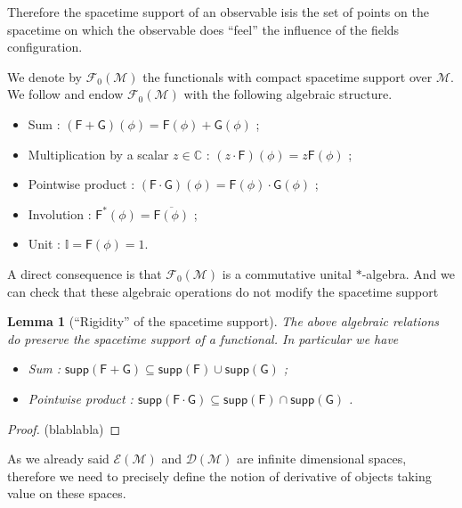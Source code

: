 \documentclass[10pt]{book}
\newcommand{\supp}{\mathsf{supp}}
\newcommand{\Dcal}{\mathcal{D}}
\newcommand{\Ecal}{\mathcal{E}}
\newcommand{\Fcal}{\mathcal{F}}
\newcommand{\Mcal}{\mathcal{M}}
\newcommand{\Cbb}{\mathbb{C}}
\newcommand{\Ibb}{\mathbb{I}}
\newcommand{\Fsf}{\mathsf{F}}
\newcommand{\Gsf}{\mathsf{G}}
\theoremstyle{break}
\newtheorem{lemma}{Lemma}
\newtheorem{proof}{Proof}
\begin{document}
Therefore the spacetime support of an observable isis the set of points on the spacetime on which the observable does ``feel'' the influence of the fields configuration.


\bigskip


We denote by $\Fcal_0(\Mcal)$ the functionals with compact spacetime support over $\Mcal$. We follow %
and endow $\Fcal_0(\Mcal)$ with the following algebraic structure.
%
\begin{itemize}
\item Sum : $(\Fsf+\Gsf)(\phi) = \Fsf(\phi) + \Gsf(\phi)$ ;
\item Multiplication by a scalar $z\in\Cbb$ : $(z \cdot \Fsf)(\phi) = z \Fsf(\phi)$ ;
\item Pointwise product : $(\Fsf \cdot \Gsf)(\phi) = \Fsf(\phi) \cdot \Gsf(\phi)$ ;
\item Involution : $\Fsf^\ast(\phi) = \overline{\Fsf(\phi)}$ ;
\item Unit : $\Ibb = \Fsf(\phi) = 1$.
\end{itemize}
%
A direct consequence is that $\Fcal_0(\Mcal)$ is a commutative unital $\ast$-algebra. And we can check that these algebraic operations do not modify the spacetime support %



\begin{lemma}[``Rigidity'' of the spacetime support]
The above algebraic relations do preserve the spacetime support of a functional. In particular we have
%
\begin{itemize}
\item Sum : $\supp(\Fsf + \Gsf) \subseteq \supp(\Fsf) \cup \supp(\Gsf)$ ;
\item Pointwise product :  $\supp(\Fsf \cdot \Gsf) \subseteq \supp(\Fsf) \cap \supp(\Gsf)$ .
\end{itemize}
%
\end{lemma}
%
%
\begin{proof}
(blablabla)
\end{proof}


\bigskip


As we already said $\Ecal(\Mcal)$ and $\Dcal(\Mcal)$ are infinite dimensional spaces, therefore we need to precisely define the notion of derivative of objects taking value on these spaces.
\end{document}
